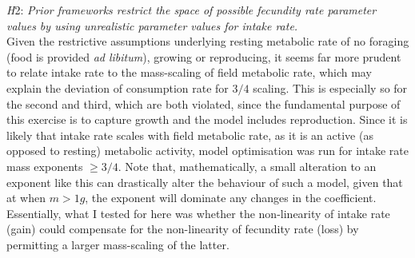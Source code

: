 \documentclass[a4paper]{article} %
\begin{document}
\textit{H}2: \textit{Prior frameworks restrict the space of possible fecundity rate parameter values by using unrealistic parameter values for intake rate.} \\
Given the restrictive assumptions underlying resting metabolic rate of no foraging (food is provided \textit{ad libitum}), growing or reproducing, it seems far more prudent to relate intake rate to the mass-scaling of field metabolic rate, which may explain the deviation of consumption rate for $3/4$ scaling. This is especially so for the second and third, which are both violated, since the fundamental purpose of this exercise is to capture growth and the model includes reproduction. Since it is likely that intake rate scales with field metabolic rate, as it is an active (as opposed to resting) metabolic activity, model optimisation was run for intake rate mass exponents $\geq 3/4$. Note that, mathematically, a small alteration to an exponent like this can drastically alter the behaviour of such a model, given that at when $m > 1 g$, the exponent will dominate any changes in the coefficient. Essentially, what I tested for here was whether the non-linearity of intake rate (gain) could compensate for the non-linearity of fecundity rate (loss) by permitting a larger mass-scaling of the latter.
\end{document}
